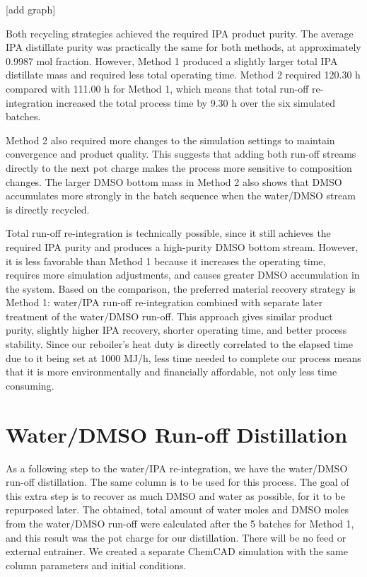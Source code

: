 {[}add graph{]}

Both recycling strategies achieved the required IPA product purity. The
average IPA distillate purity was practically the same for both methods,
at approximately 0.9987 mol fraction. However, Method 1 produced a
slightly larger total IPA distillate mass and required less total
operating time. Method 2 required 120.30 h compared with 111.00 h for
Method 1, which means that total run-off re-integration increased the
total process time by 9.30 h over the six simulated batches.

Method 2 also required more changes to the simulation settings to
maintain convergence and product quality. This suggests that adding both
run-off streams directly to the next pot charge makes the process more
sensitive to composition changes. The larger DMSO bottom mass in Method
2 also shows that DMSO accumulates more strongly in the batch sequence
when the water/DMSO stream is directly recycled.

Total run-off re-integration is technically possible, since it still
achieves the required IPA purity and produces a high-purity DMSO bottom
stream. However, it is less favorable than Method 1 because it increases
the operating time, requires more simulation adjustments, and causes
greater DMSO accumulation in the system. Based on the comparison, the
preferred material recovery strategy is Method 1: water/IPA run-off
re-integration combined with separate later treatment of the water/DMSO
run-off. This approach gives similar product purity, slightly higher IPA
recovery, shorter operating time, and better process stability. Since
our reboiler's heat duty is directly correlated to the elapsed time due
to it being set at 1000 MJ/h, less time needed to complete our process
means that it is more environmentally and financially affordable, not
only less time consuming.

\section{Water/DMSO Run-off
Distillation}\label{waterdmso-run-off-distillation}

As a following step to the water/IPA re-integration, we have the
water/DMSO run-off distillation. The same column is to be used for this
process. The goal of this extra step is to recover as much DMSO and
water as possible, for it to be repurposed later. The obtained, total
amount of water moles and DMSO moles from the water/DMSO run-off were
calculated after the 5 batches for Method 1, and this result was the pot
charge for our distillation. There will be no feed or external
entrainer. We created a separate ChemCAD simulation with the same column
parameters and initial conditions.

